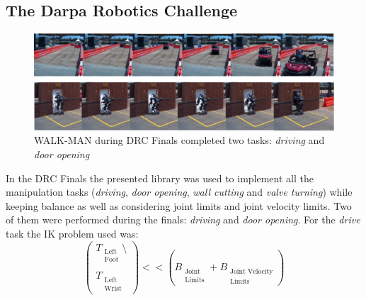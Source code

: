 

\subsection{The Darpa Robotics Challenge}
\begin{figure}
\vspace{2 mm}
\centering \includegraphics[width=\textwidth]{images/wholebody/walkman_drc.eps} 
\caption{WALK-MAN during DRC Finals completed two tasks: \emph{driving} and \emph{door opening}} 
\label{walkman_drc}
\end{figure}
In the DRC Finals the presented library was used to implement all the manipulation tasks (\emph{driving}, \emph{door opening}, \emph{wall cutting} and \emph{valve turning}) while keeping balance as well as considering joint limits and joint velocity limits. Two of them were performed during the finals: \emph{driving} and \emph{door opening}. 
For the \emph{drive} task the IK problem used was:
\begin{equation}
\begin{pmatrix}
T_{\substack{\text{Left}\\\text{Foot}}}\setminus\\
\\
T_{\substack{\text{Left}\\\text{Wrist}}}
\end{pmatrix}
<< \left(B_{\substack{\text{Joint}\\\text{Limits}}} + B_{\substack{\text{Joint Velocity}\\\text{Limits}}}\right)
\end{equation}

